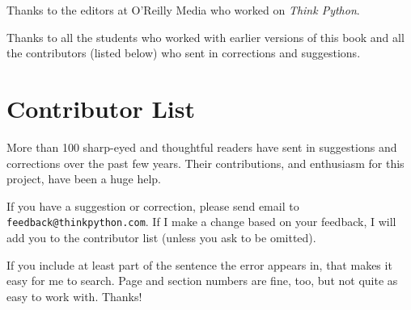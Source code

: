\documentclass[10pt]{book}
\begin{document}
Thanks to the editors at O'Reilly Media who worked on
{\em Think Python}.

Thanks to all the students who worked with earlier
versions of this book and all the contributors (listed
below) who sent in corrections and suggestions.


\section*{Contributor List}

More than 100 sharp-eyed and thoughtful readers have sent in
suggestions and corrections over the past few years.  Their
contributions, and enthusiasm for this project, have been a
huge help.

If you have a suggestion or correction, please send email to
{\tt feedback@thinkpython.com}.  If I make a change based on your
feedback, I will add you to the contributor list
(unless you ask to be omitted).

If you include at least part of the sentence the
error appears in, that makes it easy for me to search.  Page and
section numbers are fine, too, but not quite as easy to work with.
Thanks!
\end{document}
